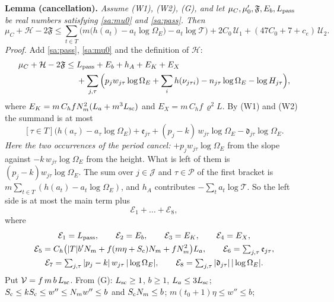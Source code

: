 \documentclass[11pt,letterpaper]{article}
\begin{document}
\textbf{Lemma (cancellation).} \emph{Assume \textup{(W1)}, \textup{(W2)}, \textup{(G)}, and let
$\mu_C,\mu_0',\mathfrak F,E_b,L_{\rm pass}$ be real numbers satisfying \eqref{sa:mu0} and
\eqref{sa:pass}. Then}
\begin{equation}\label{D:278}
 \mu_C+\mathcal H-2\mathfrak F\le\sum_{t\in T}\Big(m\big(h(a_t)-a_t\log\Omega_E\big)-a_t\log\mathcal T\Big)
 +2C_0\,\mathcal U_1+(47C_0+7+c_e)\,\mathcal U_2 .
\end{equation}
\emph{Proof.} Add \eqref{sa:pass}, \eqref{sa:mu0} and the definition of $\mathcal H$:
\begin{align}\label{D:279}
 \mu_C+\mathcal H-2\mathfrak F\le{}&L_{\rm pass}+E_b+h_A+E_K+E_X\\
 &+\sum_{j,\tau}\Big(p_jw_{j\tau}\log\Omega_E+\sum_ih(\nu_{j\tau i})-n_{j\tau}\log\Omega_E-\log H_{j\tau}\Big),
\end{align}
where $E_K=m\,C_hfN_m^2(L_a+m^3L_{\rm sc})$ and $E_X=m\,C_hf\,\varrho^2L$. By (W1) and (W2) the summand is
at most
\begin{equation}\label{D:280}
 [\tau\in T]\big(h(a_\tau)-a_\tau\log\Omega_E\big)+\mathfrak e_{j\tau}
 +(p_j-k)\,w_{j\tau}\log\Omega_E-\mathfrak d_{j\tau}\log\Omega_E .
\end{equation}
\emph{Here the two occurrences of the period cancel:} $+p_jw_{j\tau}\log\Omega_E$ from the slope against
$-k\,w_{j\tau}\log\Omega_E$ from the height. What is left of them is $(p_j-k)w_{j\tau}\log\Omega_E$. The
sum over $j\in\mathcal J$ and $\tau\in\mathcal P$ of the first bracket is
$m\sum_{t\in T}(h(a_t)-a_t\log\Omega_E)$, and $h_A$ contributes $-\sum_ta_t\log\mathcal T$. So the left
side is at most the main term plus
\begin{equation}\label{D:281}
 \mathcal E_1+\dots+\mathcal E_8,
\end{equation}
where
\begin{gather}\label{D:282}
 \mathcal E_1=L_{\rm pass},\qquad\mathcal E_2=E_b,\qquad\mathcal E_3=E_K,\qquad\mathcal E_4=E_X,\\
 \mathcal E_5=C_h\big(|T|b'N_m+f(m\eta+S_{\rm c})N_m+fN_m^2\big)L_a,\qquad
 \mathcal E_6=\textstyle\sum_{j,\tau}\mathfrak e_{j\tau},\\
 \mathcal E_7=\textstyle\sum_{j,\tau}|p_j-k|\,w_{j\tau}\,|\log\Omega_E|,\qquad
 \mathcal E_8=\textstyle\sum_{j,\tau}|\mathfrak d_{j\tau}|\,|\log\Omega_E| .
\end{gather}
Put $\mathcal V=f\,m\,b\,L_{\rm sc}$. From (G): $L_{\rm sc}\ge1$, $b\ge1$, $L_a\le3L_{\rm sc}$;
$S_{\rm c}\le kS_{\rm c}\le w''\le N_mw''\le b$ and $S_{\rm c}N_m\le b$; $m(t_0+1)\eta\le w''\le b$;
\end{document}

